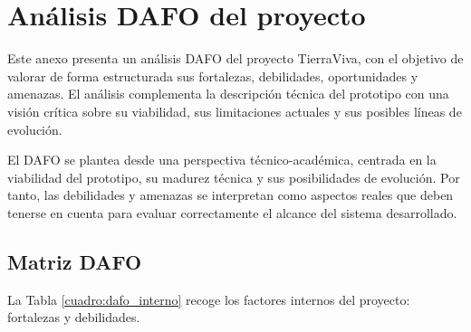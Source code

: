 \chapter{Análisis DAFO del proyecto}
\label{anexo:dafo}

Este anexo presenta un análisis DAFO del proyecto TierraViva, con el objetivo de valorar de forma estructurada sus fortalezas, debilidades, oportunidades y amenazas. El análisis complementa la descripción técnica del prototipo con una visión crítica sobre su viabilidad, sus limitaciones actuales y sus posibles líneas de evolución.

El DAFO se plantea desde una perspectiva técnico-académica, centrada en la viabilidad del prototipo, su madurez técnica y sus posibilidades de evolución. Por tanto, las debilidades y amenazas se interpretan como aspectos reales que deben tenerse en cuenta para evaluar correctamente el alcance del sistema desarrollado.

\section{Matriz DAFO}

La Tabla \ref{cuadro:dafo_interno} recoge los factores internos del proyecto: fortalezas y debilidades.

\begingroup
\small
\renewcommand{\arraystretch}{1.18}

